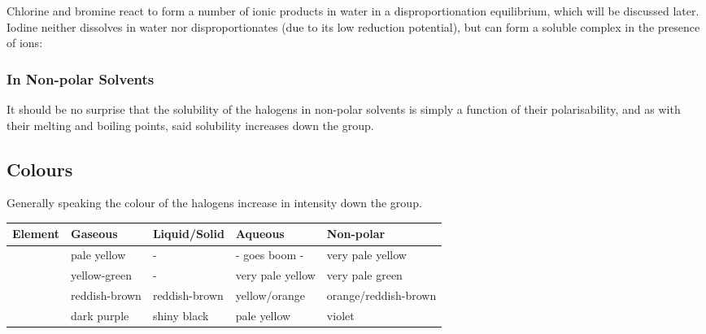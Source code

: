 				Chlorine and bromine react to form a number of ionic products in water in a disproportionation equilibrium, which will be discussed
				later. Iodine neither dissolves in water nor disproportionates (due to its low reduction potential), but can form a soluble complex
				 in the presence of  ions:




			\pagebreak
			\subsubsection{In Non-polar Solvents}

				It should be no surprise that the solubility of the halogens in non-polar solvents is simply a function of their polarisability,
				and as with their melting and boiling points, said solubility increases down the group.



		\subsection{Colours}

			Generally speaking the colour of the halogens increase in intensity down the group.

			\begin{center}\begin{table}[htb]\renewcommand{\arraystretch}{1.5}
			\begin{tabu} to \textwidth {X[c,m] | X[c,m] | X[c,m] | X[c,m] | X[c,m]}

				Element		&	Gaseous			&	Liquid/Solid	&	Aqueous					&	Non-polar			\\	\hline
						&	pale yellow		&		-			&		- goes boom -		&	very pale yellow	\\	\hline
				\ch{\Cl}	&	yellow-green	&		-			&	very pale yellow		&	very pale green		\\	\hline
						&	reddish-brown	&	reddish-brown	&	yellow/orange			&	orange/reddish-brown\\	\hline
						&	dark purple		&	shiny black		&	pale yellow				&	violet				\\	\hline

			\end{tabu}
			\end{table}\end{center}\vspace{-10mm}

